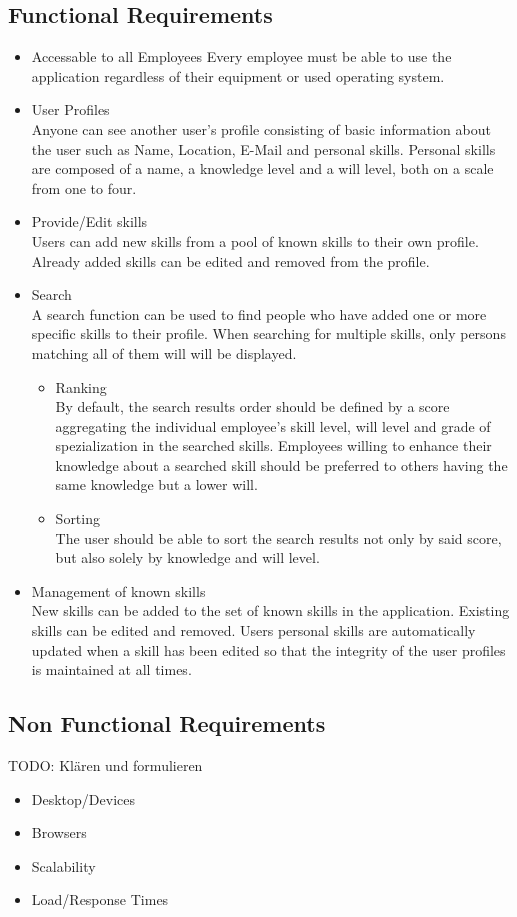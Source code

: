 \subsection{Functional Requirements}
\begin{itemize}
 	\item Accessable to all Employees
	Every employee must be able to use the application regardless of their equipment or used operating system.
	\item User Profiles \\
	Anyone can see another user’s profile consisting of basic information about the user such as Name, Location, E-Mail and personal skills. Personal skills are composed of a name, a knowledge level and a will level, both on a scale from one to four.
	\item Provide/Edit skills\\
	Users can add new skills from a pool of known skills to their own profile. Already added skills can be edited and removed from the profile.
	\item Search\\
	A search function can be used to find people who have added one or more specific skills to their profile. When searching for multiple skills, only persons matching all of them will will be displayed.
	\begin{itemize}
		\item Ranking\\
			By default, the search results order should be defined by a score aggregating the individual employee's skill level, will level and grade of spezialization in the searched skills. Employees willing to enhance their knowledge about a searched skill should be preferred to others having the same knowledge but a lower will.
		\item Sorting\\
			The user should be able to sort the search results not only by said score,
			but also solely by knowledge and will level.
	\end{itemize}
	\item Management of known skills\\
	New skills can be added to the set of known skills in the application. Existing skills can be edited and removed. Users personal skills are automatically updated when a skill has been edited so that the integrity of the user profiles is maintained at all times.
\end{itemize}

\subsection{Non Functional Requirements}
TODO: Klären und formulieren
\begin{itemize}
	\item Desktop/Devices
	\item Browsers
	\item Scalability
	\item Load/Response Times
\end{itemize}



